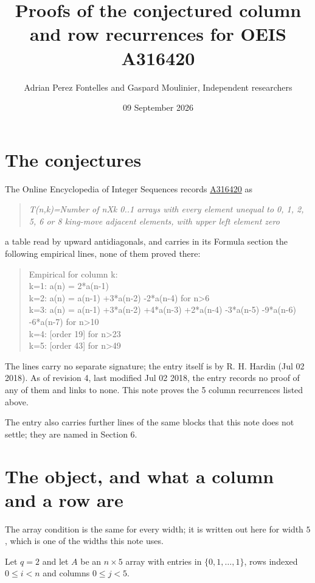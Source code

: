 \documentclass[11pt]{article}
\title{Proofs of the conjectured column and row recurrences for OEIS A316420}
\author{Adrian Perez Fontelles and Gaspard Moulinier, Independent researchers}
\date{09 September 2026}
\theoremstyle{definition}
\begin{document}
\maketitle
\section{The conjectures}

The Online Encyclopedia of Integer Sequences records \href{https://oeis.org/A316420}{A316420} as

\begin{quote}\itshape T(n,k)=Number of nXk 0..1 arrays with every element unequal to 0, 1, 2, 5, 6 or 8 king-move adjacent elements, with upper left element zero\end{quote}

a table read by upward antidiagonals, and carries in its Formula section the following empirical lines, none of them proved there:

\begin{quote}\ttfamily Empirical for column k:\\
k=1: a(n) = 2*a(n-1)\\k=2: a(n) = a(n-1) +3*a(n-2) -2*a(n-4) for n>6\\k=3: a(n) = a(n-1) +3*a(n-2) +4*a(n-3) +2*a(n-4) -3*a(n-5) -9*a(n-6) -6*a(n-7) for n>10\\k=4: [order 19] for n>23\\k=5: [order 43] for n>49\end{quote}

The lines carry no separate signature; the entry itself is by R. H. Hardin (Jul 02 2018). As of revision 4, last modified Jul 02 2018, the entry records no proof of any of them and links to none. This note proves the 5 column recurrences listed above.

The entry also carries further lines of the same blocks that this note does not settle; they are named in Section 6.

\section{The object, and what a column and a row are}

The array condition is the same for every width; it is written out here for width $5$, which is one of the widths this note uses.

Let $q = 2$ and let $A$ be an $n \times 5$ array with entries in $\{0,1,\dots,1\}$, rows indexed $0 \le i < n$ and columns $0 \le j < 5$.
\end{document}
